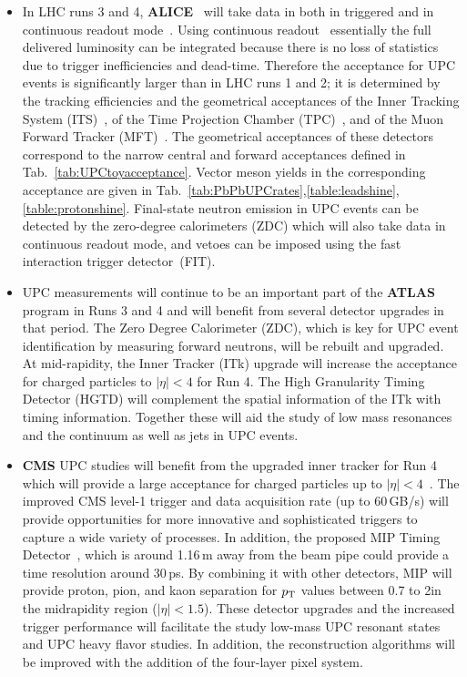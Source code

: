 \documentclass[../report.tex]{subfiles}
\begin{document}
\begin{itemize}
\item In LHC runs 3 and 4, \textbf{ALICE}~\cite{Abelevetal:2014cna} will take data in
both in triggered and in continuous readout mode~\cite{Buncic:2015ari}. Using continuous
readout~\cite{Antoniolietal:2013} essentially the full delivered luminosity can be integrated
because there is no loss of statistics due to trigger
inefficiencies and dead-time. Therefore the acceptance for UPC events is significantly larger
than in LHC runs 1 and 2; it is determined by the tracking
efficiencies and the geometrical acceptances of the Inner Tracking
System (ITS)~\cite{Abelevetal:2014dna}, of the Time Projection Chamber (TPC)~\cite{ALICE:2014qrd}, and of the Muon Forward Tracker (MFT)~\cite{Uras:2012af}. The geometrical acceptances of these detectors correspond to the narrow central and forward acceptances defined in Tab.~\ref{tab:UPCtoyacceptance}. Vector meson yields in the corresponding acceptance are given in Tab.~\ref{tab:PbPbUPCrates},\ref{table:leadshine},\ref{table:protonshine}.
Final-state neutron emission in UPC events can be detected by the
zero-degree calorimeters (ZDC) which will also take data in continuous
readout mode, and vetoes can be imposed using the fast interaction
trigger detector~(FIT). %
\item UPC measurements will continue to be an important part of the \textbf{ATLAS} program in Runs 3 and 4 and will benefit from several detector upgrades in that period.  The Zero Degree Calorimeter (ZDC), which is key for UPC event identification by measuring forward neutrons, will be rebuilt and upgraded.  At mid-rapidity, the Inner Tracker (ITk) upgrade \cite{ATL-PHYS-PUB-2016-025} will increase the acceptance for charged particles to $|\eta|<4$ for Run 4.   The High Granularity Timing Detector (HGTD)  \cite{Collaboration:2623663} will complement the spatial information of the ITk with timing information.  Together these will aid the study of low mass resonances and the continuum as well as jets in UPC events.   
\item \textbf{CMS} UPC studies will benefit from the upgraded inner tracker for Run 4 which will provide a large acceptance for charged particles up to $|\eta|<4$~\cite{CMS-TDR-15-02}. The improved CMS level-1 trigger and data acquisition rate (up to 60\,\unit{GB/s}) will provide opportunities for more innovative and sophisticated triggers to capture a wide variety of processes. In addition, the proposed MIP Timing Detector~\cite{Collaboration:2296612}, which is around 1.16\,\unit{m} away from the beam pipe could provide a time resolution around 30\,\unit{ps}. By combining it with other detectors, MIP will provide proton, pion, and kaon separation for $p\sb{\scriptstyle\mathrm{T}}$ values between 0.7 to 2\UGeVc in the midrapidity region ($|\eta|<1.5$). These detector upgrades and the increased trigger performance will facilitate the study low-mass UPC resonant states and UPC heavy flavor studies. In addition, the reconstruction algorithms will be improved with the addition of the four-layer pixel system. 

\end{itemize}
\end{document}
